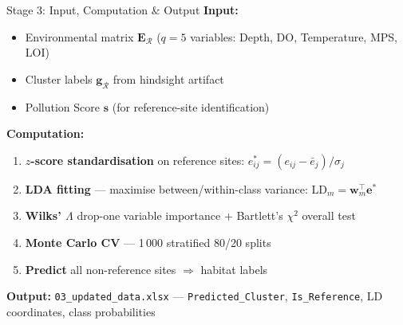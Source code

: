 \documentclass[aspectratio=169, 11pt]{beamer}
\newcommand{\code}[1]{\texttt{\small #1}}
\newcommand{\mat}[1]{\mathbf{#1}}
\begin{document}
\begin{frame}{Stage 3: Input, Computation \& Output}
  \textbf{Input:}
  \begin{itemize}\small
    \item Environmental matrix $\mat{E}_{\mathcal{R}}$ ($q{=}5$ variables:
          Depth, DO, Temperature, MPS, LOI)
    \item Cluster labels $\mathbf{g}_{\mathcal{R}}$ from hindsight artifact
    \item Pollution Score $\mathbf{s}$ (for reference-site identification)
  \end{itemize}

  \vspace{0.3em}
  \textbf{Computation:}
  \begin{enumerate}\small
    \item \textbf{$z$-score standardisation} on reference sites:
          $e_{ij}^{*} = (e_{ij} - \bar{e}_j)/\sigma_j$
    \item \textbf{LDA fitting} --- maximise between/within-class variance:
          $\mathrm{LD}_m = \mathbf{w}_m^{\!\top}\mathbf{e}^{*}$
    \item \textbf{Wilks' $\Lambda$} drop-one variable importance +
          Bartlett's $\chi^2$ overall test
    \item \textbf{Monte Carlo CV} --- 1\,000 stratified 80/20 splits
    \item \textbf{Predict} all non-reference sites $\Rightarrow$ habitat labels
  \end{enumerate}

  \vspace{0.3em}
  \textbf{Output:} \code{03\_updated\_data.xlsx} ---
  \code{Predicted\_Cluster}, \code{Is\_Reference}, LD coordinates, class probabilities
\end{frame}
\end{document}
